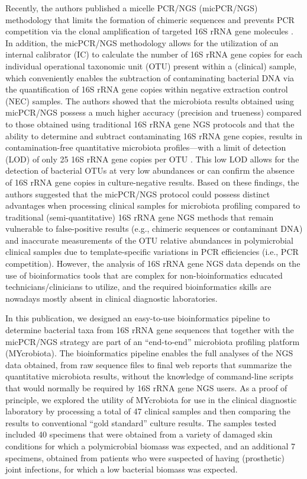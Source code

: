 Recently, the authors published a micelle PCR/NGS (micPCR/NGS) methodology that limits the formation of chimeric sequences
and prevents PCR competition via the clonal amplification of targeted 16S rRNA gene molecules \cite{boers2015micelle}. In addition, the micPCR/NGS
methodology allows for the utilization of an internal calibrator (IC) to calculate the number of 16S rRNA gene copies for each
individual operational taxonomic unit (OTU) present within a (clinical) sample, which conveniently enables the subtraction of
contaminating bacterial DNA via the quantification of 16S rRNA gene copies within negative extraction control (NEC) samples.
The authors showed that the microbiota results obtained using micPCR/NGS possess a much higher accuracy (precision and trueness)
compared to those obtained using traditional 16S rRNA gene NGS protocols and that the ability to determine and subtract contaminating
16S rRNA gene copies, results in contamination-free quantitative microbiota profiles—with a limit of detection (LOD) of only 25 16S
rRNA gene copies per OTU \cite{boers2017novel}. This low LOD allows for the detection of bacterial OTUs at very low abundances or can confirm the absence
of 16S rRNA gene copies in culture-negative results. Based on these findings, the authors suggested that the micPCR/NGS protocol could
possess distinct advantages when processing clinical samples for microbiota profiling compared to traditional (semi-quantitative) 16S
rRNA gene NGS methods that remain vulnerable to false-positive results (e.g., chimeric sequences or contaminant DNA) and inaccurate
measurements of the OTU relative abundances in polymicrobial clinical samples due to template-specific variations in PCR efficiencies
(i.e., PCR competition). However, the analysis of 16S rRNA gene NGS data depends on the use of bioinformatics tools that are complex
for non-bioinformatics educated technicians/clinicians to utilize, and the required bioinformatics skills are nowadays mostly absent
in clinical diagnostic laboratories.

In this publication, we designed an easy-to-use bioinformatics pipeline to determine bacterial taxa from 16S rRNA gene sequences that
together with the micPCR/NGS strategy are part of an “end-to-end” microbiota profiling platform (MYcrobiota). The bioinformatics pipeline
enables the full analyses of the NGS data obtained, from raw sequence files to final web reports that summarize the quantitative
microbiota results, without the knowledge of command-line scripts that would normally be required by 16S rRNA gene NGS users. As a
proof of principle, we explored the utility of MYcrobiota for use in the clinical diagnostic laboratory by processing a total of 47
clinical samples and then comparing the results to conventional “gold standard” culture results. The samples tested included 40
specimens that were obtained from a variety of damaged skin conditions for which a polymicrobial biomass was expected, and an
additional 7 specimens, obtained from patients who were suspected of having (prosthetic) joint infections, for which a low bacterial
biomass was expected.

